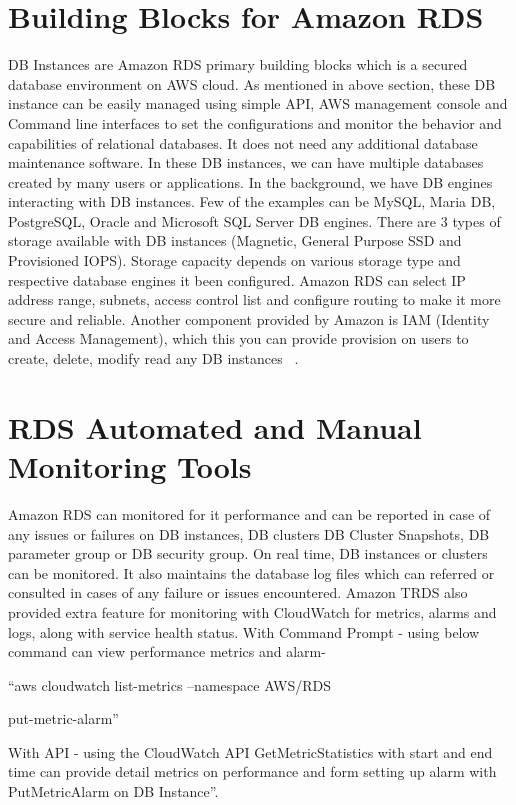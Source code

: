 \section{Building Blocks for Amazon RDS}

DB Instances are Amazon RDS primary building blocks which is a secured database 
environment on AWS cloud. As mentioned in above section, these DB instance can be 
easily managed using simple API, AWS management console and Command line interfaces 
to set the configurations and monitor the behavior and capabilities of relational 
databases. It does not need any additional database maintenance software.
In these DB instances, we can have multiple databases created by many users or 
applications.
In the background, we have DB engines interacting with DB instances. Few of the 
examples can be MySQL, Maria DB, PostgreSQL, Oracle and Microsoft SQL Server DB 
engines.
There are 3 types of storage available with DB instances (Magnetic, General 
Purpose SSD and Provisioned IOPS).
Storage capacity depends on various storage type and respective database engines 
it been configured.
Amazon RDS can select IP address range, subnets, access control list and 
configure routing to make it more secure and reliable.
Another component provided by Amazon is IAM (Identity and Access Management), 
which this you can provide provision on users to create, delete, modify read 
any DB instances
~\cite{hid-sp18-520-amazonrdswel}.

\section{RDS Automated and Manual Monitoring Tools}

Amazon RDS can monitored for it performance and can be reported in case of 
any issues or failures on DB instances, DB clusters DB Cluster Snapshots, DB 
parameter group or DB security group.
On real time, DB instances or clusters can be monitored. It also maintains the 
database log files which can referred or consulted in cases of any failure or 
issues encountered.
Amazon TRDS also provided extra feature for monitoring with CloudWatch for 
metrics, alarms and logs, along with service health status.
With Command Prompt - using below command can view performance metrics and 
alarm- 

``aws cloudwatch list-metrics --namespace AWS/RDS

put-metric-alarm''

With API - using the CloudWatch API GetMetricStatistics with start and end time 
can provide detail metrics on performance and form setting up alarm 
with PutMetricAlarm on DB Instance''.

